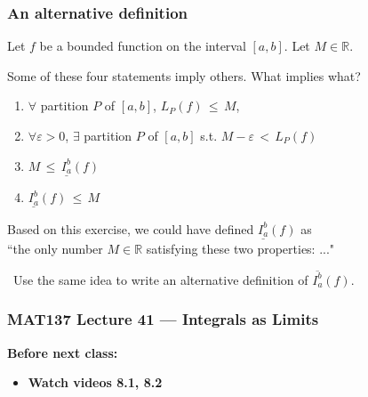 \documentclass[14pt]{beamer}
\newcommand{\R}{\mathbb{R}}
\newcommand{\e}{\varepsilon}
\newcommand{\p}{\pause}
\newcommand{\setsize}[1]{\fontsize{#1}{#1}\selectfont} %
\newcommand{\smallerfont}{\setsize{13}} %
\newcommand{\lifab}{\underline{I_a^b}(f)}
\newcommand{\uifab}{\overline{I_a^b}(f)}
\begin{document}
	\begin{frame}[t]
		\smallerfont
		\frametitle{An alternative definition}

		Let $f$ be a bounded function on the interval $[a,b]$. Let $M \in \R$.

		Some of these four statements imply others. What implies what?
		\vspace{.2cm}
		\begin{enumerate}
			\item $\forall$ partition $P$ of $[a,b]$, \;
				${\displaystyle L_P(f) \,\leq\, M}$,
				\vspace{.2cm}

			\item $\forall \e>0$, $\exists$ partition $P$ of $[a,b]$ \; s.t. \; ${\displaystyle M - \e \,< \, L_P(f)}$
				\vspace{.2cm}

			\item ${\displaystyle M \, \leq \, \lifab}$

			\item ${\displaystyle \lifab \, \leq \, M}$
		\end{enumerate}

		\p
		\vfill

		Based on this exercise, we could have defined $\lifab$ as \\``the only number
		$M \in \R$ satisfying these two properties: ..."

		\
 Use the same idea to write an alternative definition of $\uifab$.

		\vfill
	\end{frame}




\begin{frame}
	\frametitle{MAT137 Lecture 41 --- Integrals as Limits}

	\vfill
	{\bf Before next class:}
		\begin{itemize} \normalsize
			\item {\bf Watch videos 8.1, 8.2}
		\end{itemize}
\end{frame}
\end{document}
